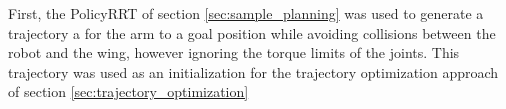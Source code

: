 \documentclass[../thesis.tex]{subfiles}
\begin{document}
First, the PolicyRRT of section \ref{sec:sample_planning} was used to generate a trajectory a for the arm to a goal position while avoiding collisions between the robot and the wing, however ignoring the torque limits of the joints.
This trajectory was used as an initialization for the trajectory optimization approach of section \ref{sec:trajectory_optimization}




\end{document}
